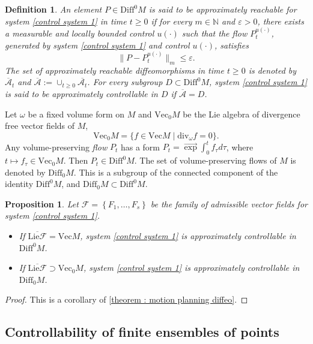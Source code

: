 \documentclass[10pt]{article}
\newcommand{\e}{\varepsilon}
\newcommand{\N}{{\mathbb N}}
\newcommand{\F}{\mathcal F}
\newcommand{\ov}{\overline}
\newcommand{\E}
{\overrightarrow{\exp}\int}
\newtheorem{prop}{Proposition}
\newtheorem{definition}{Definition}
\begin{document}
\begin{definition} \label{def : attainable set diffeo}
    An element $P \in \mathrm{Diff}^0M$ is said to be approximately reachable for system \eqref{control system 1} in time $t\geq 0$ if for every $m\in \N$ and $\e >0$, there exists a measurable and locally bounded control $u(\cdot)$ such that the flow $P^{u(\cdot)}_t$, generated by system \eqref{control system 1} and control $u(\cdot)$, satisfies
    \begin{equation*}
        \|P-P^{u(\cdot)}_t\|_{m}\leq \e.
    \end{equation*}
    The set of approximately reachable diffeomorphisms in time $t\geq 0$ is denoted by $\ov{\mathcal{A}}_t$ and $\ov{\mathcal{A}}:=\cup_{t\geq 0}\ov{\mathcal{A}_t}$. For every subgroup $D \subset \mathrm{Diff}^0M$, system \eqref{control system 1} is said to be approximately controllable in $D$ if $\ov{\mathcal{A}}=D$.
\end{definition}
 Let $\omega$ be a fixed volume form on $M$ and $\mathrm{Vec}_0M$ be the Lie algebra of divergence free vector fields of $M$,
  $$
  \mathrm{Vec}_0M=\{f\in\mathrm{Vec}M \mid  \mathrm{div}_\omega f=0\}.
  $$
  Any volume-preserving \textit{flow} $P_t$ has a form $P_t =\E_0^tf_{\tau}d\tau$, where $t \mapsto f_{\tau}\in \mathrm{Vec}_0M$. Then $P_t\in \mathrm{Diff}^0M$. The set of volume-preserving flows of $M$ is denoted by $\mathrm{Diff}_0M$. This is a subgroup of the connected component of the identity $\mathrm{Diff}^0 M$, and $\mathrm{Diff}_0M\subset \mathrm{Diff}^0M$. 
\begin{prop}
    Let $\F=\left\{F_1,\dots,F_s\right\}$ be the family of admissible vector fields for system \eqref{control system 1}. 
    \begin{itemize}
        \item If $\ov{\mathrm{Lie}\F}=\mathrm{Vec}M$, system \eqref{control system 1} is approximately controllable in $\mathrm{Diff}^0 M$.
        \item If $\ov{\mathrm{Lie}\F}\supset\mathrm{Vec}_0M$, system \eqref{control system 1} is approximately controllable in $\mathrm{Diff}_0 M$.
    \end{itemize}
\end{prop}
\begin{proof}
    This is a corollary of \cref{theorem : motion planning diffeo}.
\end{proof}


\subsection{Controllability of finite ensembles of points}
\end{document}
